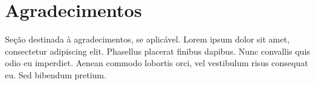 \documentclass[a4paper]{article}
\begin{document}
\section*{Agradecimentos}

Seção destinada à agradecimentos, se aplicável. Lorem ipsum dolor sit amet, consectetur adipiscing elit. Phasellus placerat finibus dapibus. Nunc convallis quis odio eu imperdiet. Aenean commodo lobortis orci, vel vestibulum risus consequat eu. Sed bibendum pretium.

\printbibliography
\end{document}
